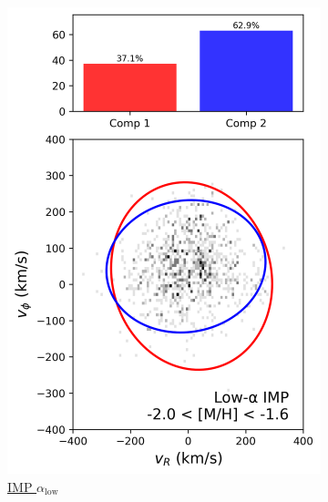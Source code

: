 \documentclass[a4paper,10pt]{article}
\begin{document}
\begin{multicols}{2}
\begin{figure}[H]
\begin{subfigure}[t]{0.24\linewidth}
    \includegraphics[width=\linewidth]{../figures/gmm_imp_low_alpha_k2.png}
    \caption{\href{https://raw.githack.com/raunaq-rai/Disentangling-the-Milky-Way-using-GMM/main/figures/IMP\_low\_\_\_\_-2\%5BM\_H\%5D-1.6.html}{IMP $\alpha_{\mathrm{low}}$}}
    \label{fig:low_imp}
  \end{subfigure}\hfill
  \begin{subfigure}[t]{0.24\linewidth}

\end{subfigure}
\end{figure}
\end{multicols}
\end{document}
